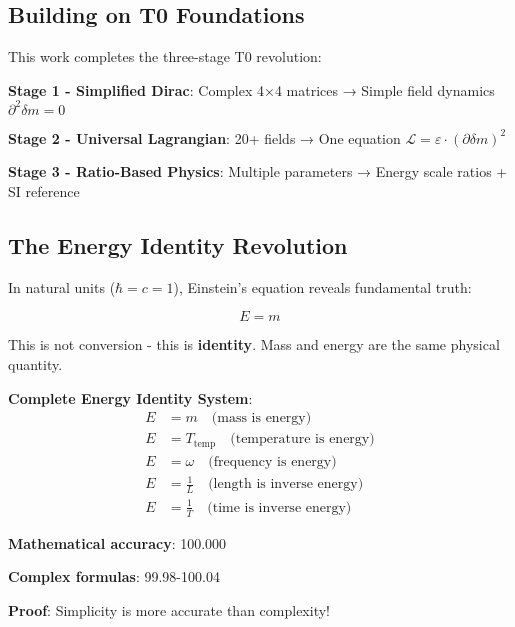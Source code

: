 \documentclass[12pt,a4paper]{article}
\newcommand{\Lag}{\mathcal{L}}
\newcommand{\deltam}{\delta m}
\theoremstyle{definition}
\theoremstyle{remark}
\begin{document}
	\subsection{Building on T0 Foundations}
	
	This work completes the three-stage T0 revolution:
	
	\textbf{Stage 1 - Simplified Dirac}: Complex 4×4 matrices → Simple field dynamics $\partial^2 \deltam = 0$
	
	\textbf{Stage 2 - Universal Lagrangian}: 20+ fields → One equation $\Lag = \varepsilon \cdot (\partial \deltam)^2$
	
	\textbf{Stage 3 - Ratio-Based Physics}: Multiple parameters → Energy scale ratios + SI reference
	
	\subsection{The Energy Identity Revolution}
	
	In natural units ($\hbar = c = 1$), Einstein's equation reveals fundamental truth:
	
	\begin{equation}
		\boxed{E = m}
		\label{eq:energy_mass_identity}
	\end{equation}
	
	This is not conversion - this is \textbf{identity}. Mass and energy are the same physical quantity.
	
	\begin{tcolorbox}[colback=blue!5!white,colframe=blue!75!black,title=Universal Energy Relations]
		\textbf{Complete Energy Identity System}:
		\begin{align}
			E &= m \quad \text{(mass is energy)} \\
			E &= T_{\text{temp}} \quad \text{(temperature is energy)} \\
			E &= \omega \quad \text{(frequency is energy)} \\
			E &= \frac{1}{L} \quad \text{(length is inverse energy)} \\
			E &= \frac{1}{T} \quad \text{(time is inverse energy)}
		\end{align}
		
		\textbf{Mathematical accuracy}: 100.000%
		
		\textbf{Complex formulas}: 99.98-100.04%
		
		\textbf{Proof}: Simplicity is more accurate than complexity!
	\end{tcolorbox}
	
\end{document}
